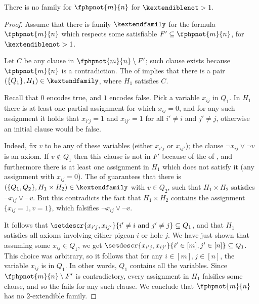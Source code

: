 \documentclass{toc}
\begin{document}
\begin{theorem}
  There is no \kextendible family for $\fphpnot{m}{n}$ for $\kextendiblenot > 1$.
\end{theorem}
\begin{proof}

  Assume that there is \akextendible family $\kextendfamily$ for
  the formula $\fphpnot{m}{n}$ which respects some satisfiable
  $F'\subseteq \fphpnot{m}{n}$, for $\kextendiblenot>1$.

  Let $C$ be any clause in $\fphpnot{m}{n}\setminus F'$; such clause exists because $\fphpnot{m}{n}$ is a contradiction.
  The \extensionproperty of \kextendfamily implies that there is a
  pair $(\{Q_{1}\}, H_{1} )\in\kextendfamily$, where $H_{1}$ satisfies $C$.

  Recall that $0$ encodes true, and $1$ encodes false. Pick a
  variable $x_{ij}$ in $Q_{1}$. In $H_{1}$ there is at least one
  partial assignment for which $x_{ij}=0$, and for any such assignment
  it holds that $x_{i'j}=1$ and $x_{ij'}=1$ for all $i'\not=i$ and
  $j'\not=j$, otherwise an initial clause would be false.

  Indeed, fix $v$ to be any of these variables (either $x_{i'j}$ or
  $x_{ij'}$); the clause $\lnot{x_{ij}} \lor \lnot{v}$ is an axiom.
  If $v \not\in Q_{1}$ then this clause is not in $F'$ because of the
  \respectfulness of \kextendfamily, and furthermore there is at
  least one assignment in $H_{1}$ which does not satisfy it (\ieComma any assignment with
  $x_{ij}=0$).
  The \extensionproperty of \kextendfamily guarantees that there is
  $(\{Q_{1},Q_{2}\},H_{1}\times H_{2}) \in \kextendfamily$ with $v\in
  Q_{2}$, such that $H_{1}\times H_{2}$ satisfies $\lnot{x_{ij}} \lor
  \lnot{v}$. But this contradicts the fact that $H_{1}\times H_{2}$
  contains the assignment $\{x_{ij}=1,v=1\}$, which falsifies
  $\lnot{x_{ij}} \lor \lnot{v}$.


  It follows that $\setdescr{x_{i'j},x_{ij'}}{i'\not=i \text{\ and\
    } j'\not=j} \subseteq Q_{1}$, and that $H_{1}$ satisfies all
  axioms involving either pigeon $i$ or hole $j$.
  We have just shown that assuming some $x_{ij}\in Q_{1}$, we get
  \mbox{$\setdescr{x_{i'j},x_{ij'}}{i'\in[m], j'\in[n]}\subseteq
    Q_{1}$}. This choice was arbitrary, so it follows that for any
  $i\in[m], j\in[n]$, the variable $x_{ij}$ is in $Q_{1}$. In other
  words, $Q_1$ contains all the variables. Since
  $\fphpnot{m}{n}\setminus F'$ is contradictory, every assignment in
  $H_1$ falsifies some clause, and so the \extensionproperty fails for
  any such clause.  We conclude that $\fphpnot{m}{n}$ has no
  $2$-extendible family.
  \end{proof}
\end{document}

